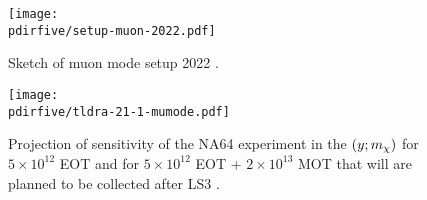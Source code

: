 \begin{figure}[bth!]
  \centering
  \texttt{[image: \\pdirfive/setup-muon-2022.pdf]}
  \caption[Sketch of muon mode setup 2022 for phase 1]{Sketch of muon mode setup 2022 \cite{Gninenko:2640930}.}
  \label{fig:muon-mode-setup-phase2}
\end{figure}

\begin{figure}[bth!]
  \centering
  \texttt{[image: \\pdirfive/tldra-21-1-mumode.pdf]}
  \caption[sensitivity projection for invisible mode + muon mode 2021]{Projection of sensitivity of the NA64 experiment in the $(y;m_{\chi})$ for $5 \times 10^{12}$ EOT and for $5 \times 10^{12}$ EOT + $2 \times 10^{13}$ MOT that will are planned to be collected after LS3 \cite{Gninenko:2019qiv}.}
  \label{fig:dmyplane-mumode}
\end{figure}


